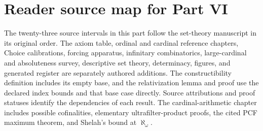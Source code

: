 \section*{Reader source map for Part VI}
\label{sec:p06-source-map}

The twenty-three source intervals in this part follow the
set-theory manuscript in its original order.  The axiom table,
ordinal and cardinal reference chapters, Choice calibrations, forcing
apparatus, infinitary combinatorics, large-cardinal and absoluteness survey,
descriptive set theory, determinacy, figures, and generated register are
separately authored additions.
The constructibility definition includes its empty base, and the
relativization lemma and proof use the declared index bounds and that base
case directly.  Source attributions and proof statuses identify the
dependencies of each result.
The cardinal-arithmetic chapter includes possible cofinalities, elementary
ultrafilter-product proofs, the cited PCF maximum theorem, and Shelah's
bound at \(\aleph_\omega\).
